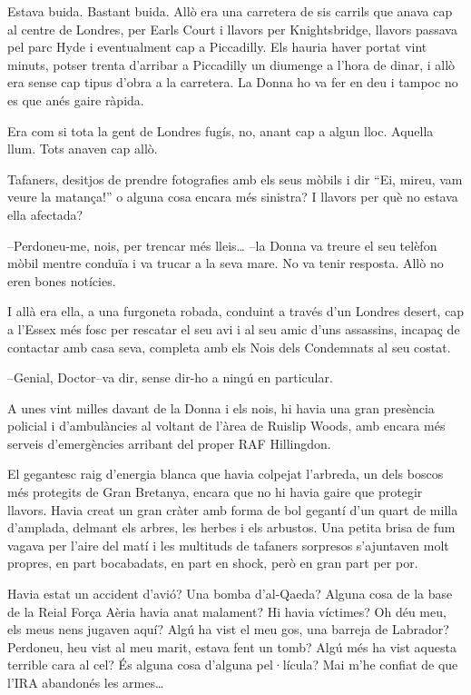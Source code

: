 Estava buida. Bastant buida. Allò era una carretera de sis carrils que
anava cap al centre de Londres, per Earls Court i llavors per
Knightsbridge, llavors passava pel parc Hyde i eventualment cap a
Piccadilly. Els hauria haver portat vint minuts, potser trenta d'arribar
a Piccadilly un diumenge a l'hora de dinar, i allò era sense cap tipus
d'obra a la carretera. La Donna ho va fer en deu i tampoc no es que anés
gaire ràpida.

Era com si tota la gent de Londres fugís, no, anant cap a algun lloc.
Aquella llum. Tots anaven cap allò.

Tafaners, desitjos de prendre fotografies amb els seus mòbils i dir
``Ei, mireu, vam veure la matança!'' o alguna cosa encara més sinistra?
I llavors per què no estava ella afectada?

--Perdoneu-me, nois, per trencar més lleis\ldots{} --la Donna va treure
el seu telèfon mòbil mentre conduïa i va trucar a la seva mare. No va
tenir resposta. Allò no eren bones notícies.

I allà era ella, a una furgoneta robada, conduint a través d'un Londres
desert, cap a l'Essex més fosc per rescatar el seu avi i al seu amic
d'uns assassins, incapaç de contactar amb casa seva, completa amb els
Nois dels Condemnats al seu costat.

--Genial, Doctor--va dir, sense dir-ho a ningú en particular.

A unes vint milles davant de la Donna i els nois, hi havia una gran
presència policial i d'ambulàncies al voltant de l'àrea de Ruislip
Woods, amb encara més serveis d'emergències arribant del proper RAF
Hillingdon.

El gegantesc raig d'energia blanca que havia colpejat l'arbreda, un dels
boscos més protegits de Gran Bretanya, encara que no hi havia gaire que
protegir llavors. Havia creat un gran cràter amb forma de bol gegantí
d'un quart de milla d'amplada, delmant els arbres, les herbes i els
arbustos. Una petita brisa de fum vagava per l'aire del matí i les
multituds de tafaners sorpresos s'ajuntaven molt propres, en part
bocabadats, en part en shock, però en gran part per por.

Havia estat un accident d'avió? Una bomba d'al-Qaeda? Alguna cosa de la
base de la Reial Força Aèria havia anat malament? Hi havia víctimes? Oh
déu meu, els meus nens jugaven aquí? Algú ha vist el meu gos, una
barreja de Labrador? Perdoneu, heu vist al meu marit, estava fent un
tomb? Algú més ha vist aquesta terrible cara al cel? És alguna cosa
d'alguna pel·lícula? Mai m'he confiat de que l'IRA abandonés les
armes\ldots{}

